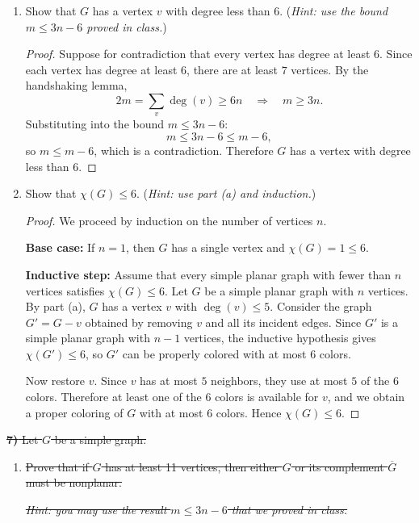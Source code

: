 \documentclass[12pt]{article}
\begin{document}
\begin{enumerate}
\item[a)] Show that $G$ has a vertex $v$ with degree less than 6. (\textit{Hint: use the bound $m \leq 3n - 6$ proved in class.})

\begin{proof}
Suppose for contradiction that every vertex has degree at least $6$. Since each vertex has degree at least $6$, there are at least $7$ vertices. By the handshaking lemma,
\[2m = \sum_{v} \deg(v) \geq 6n \quad \Longrightarrow \quad m \geq 3n.\]
Substituting into the bound $m \leq 3n - 6$:
\[m \leq 3n - 6 \leq m - 6,\]
so $m \leq m - 6$, which is a contradiction. Therefore $G$ has a vertex with degree less than $6$.
\end{proof}

\item[b)] Show that $\chi(G) \leq 6$. (\textit{Hint: use part (a) and induction.})

\begin{proof}
We proceed by induction on the number of vertices $n$.

\textbf{Base case:} If $n = 1$, then $G$ has a single vertex and $\chi(G) = 1 \leq 6$.

\textbf{Inductive step:} Assume that every simple planar graph with fewer than $n$ vertices satisfies $\chi(G) \leq 6$. Let $G$ be a simple planar graph with $n$ vertices. By part (a), $G$ has a vertex $v$ with $\deg(v) \leq 5$. Consider the graph $G' = G - v$ obtained by removing $v$ and all its incident edges. Since $G'$ is a simple planar graph with $n - 1$ vertices, the inductive hypothesis gives $\chi(G') \leq 6$, so $G'$ can be properly colored with at most $6$ colors.

Now restore $v$. Since $v$ has at most $5$ neighbors, they use at most $5$ of the $6$ colors. Therefore at least one of the $6$ colors is available for $v$, and we obtain a proper coloring of $G$ with at most $6$ colors. Hence $\chi(G) \leq 6$.
\end{proof}
\end{enumerate}

\sout{\textbf{7)} Let $G$ be a simple graph.}

\begin{enumerate}
\item[b)] \sout{Prove that if $G$ has at least 11 vertices, then either $G$ or its complement $\overline{G}$ must be nonplanar.}

\sout{\textit{Hint: you may use the result $m \leq 3n - 6$ that we proved in class.}}
\end{enumerate}
\end{document}
